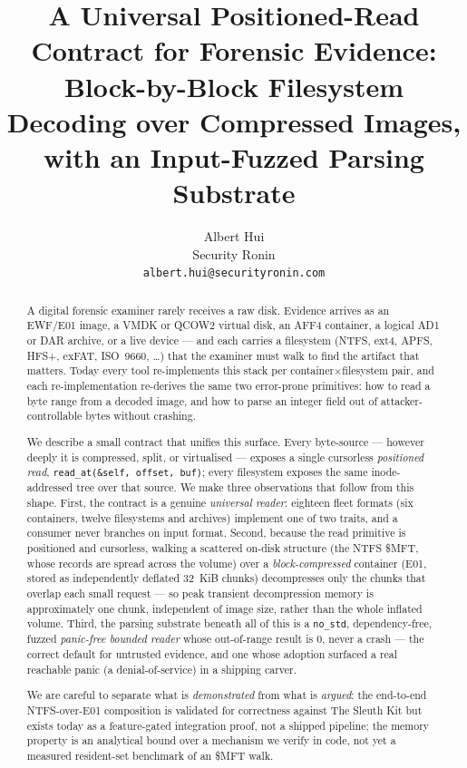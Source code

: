 \documentclass[10pt,twocolumn]{article}
\title{\bfseries A Universal Positioned-Read Contract for Forensic Evidence:\\
Block-by-Block Filesystem Decoding over Compressed Images,\\
with an Input-Fuzzed Parsing Substrate}
\author{}
\author{Albert Hui\\ Security Ronin\\ \texttt{albert.hui@securityronin.com}}
\date{}
\begin{document}
\maketitle

\begin{abstract}
\noindent
A digital forensic examiner rarely receives a raw disk. Evidence arrives as an
EWF/E01 image, a VMDK or QCOW2 virtual disk, an AFF4 container, a logical AD1 or
DAR archive, or a live device --- and each carries a filesystem (NTFS, ext4,
APFS, HFS+, exFAT, ISO~9660, \dots) that the examiner must walk to find the
artifact that matters. Today every tool re-implements this stack per
container$\times$filesystem pair, and each re-implementation re-derives the same
two error-prone primitives: how to read a byte range from a decoded image, and
how to parse an integer field out of attacker-controllable bytes without
crashing.

We describe a small contract that unifies this surface. Every byte-source ---
however deeply it is compressed, split, or virtualised --- exposes a single
cursorless \emph{positioned read}, \texttt{read\_at(\&self, offset, buf)}; every
filesystem exposes the same inode-addressed tree over that source. We make three
observations that follow from this shape. First, the contract is a genuine
\emph{universal reader}: eighteen fleet formats (six containers, twelve
filesystems and archives) implement one of two traits, and a consumer never
branches on input format. Second, because the read primitive is positioned and
cursorless, walking a scattered on-disk structure (the NTFS \$MFT, whose records
are spread across the volume) over a \emph{block-compressed} container (E01,
stored as independently deflated 32~KiB chunks) decompresses only the chunks that
overlap each small request --- so peak transient decompression memory is
approximately one chunk, independent of image size, rather than the whole
inflated volume. Third, the parsing substrate beneath all of this is a
\texttt{no\_std}, dependency-free, fuzzed \emph{panic-free bounded reader} whose
out-of-range result is $0$, never a crash --- the correct default for untrusted
evidence, and one whose adoption surfaced a real reachable panic (a
denial-of-service) in a shipping carver.

We are careful to separate what is \emph{demonstrated} from what is
\emph{argued}: the end-to-end NTFS-over-E01 composition is validated for
correctness against The Sleuth Kit but exists today as a feature-gated
integration proof, not a shipped pipeline; the memory property is an analytical
bound over a mechanism we verify in code, not yet a measured
resident-set benchmark of an \$MFT walk.
\end{abstract}
\end{document}
